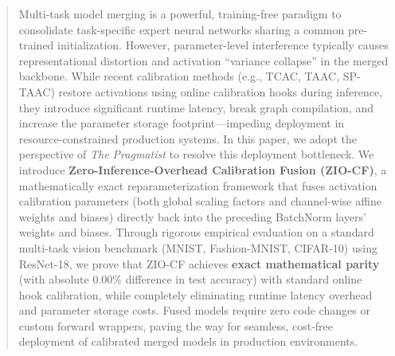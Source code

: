 \documentclass{article}
\begin{document}
\setlength{\abovedisplayskip}{3pt}
\setlength{\belowdisplayskip}{3pt}
\setlength{\abovedisplayshortskip}{2pt}
\setlength{\belowdisplayshortskip}{2pt}


\printAffiliationsAndNotice{}

\begin{abstract}
Multi-task model merging is a powerful, training-free paradigm to consolidate task-specific expert neural networks sharing a common pre-trained initialization. However, parameter-level interference typically causes representational distortion and activation ``variance collapse'' in the merged backbone. While recent calibration methods (e.g., TCAC, TAAC, SP-TAAC) restore activations using online calibration hooks during inference, they introduce significant runtime latency, break graph compilation, and increase the parameter storage footprint---impeding deployment in resource-constrained production systems. In this paper, we adopt the perspective of \textit{The Pragmatist} to resolve this deployment bottleneck. We introduce \textbf{Zero-Inference-Overhead Calibration Fusion (ZIO-CF)}, a mathematically exact reparameterization framework that fuses activation calibration parameters (both global scaling factors and channel-wise affine weights and biases) directly back into the preceding BatchNorm layers' weights and biases. Through rigorous empirical evaluation on a standard multi-task vision benchmark (MNIST, Fashion-MNIST, CIFAR-10) using ResNet-18, we prove that ZIO-CF achieves \textbf{exact mathematical parity} (with absolute $0.00\%$ difference in test accuracy) with standard online hook calibration, while completely eliminating runtime latency overhead and parameter storage costs. Fused models require zero code changes or custom forward wrappers, paving the way for seamless, cost-free deployment of calibrated merged models in production environments.
\end{abstract}
\end{document}
